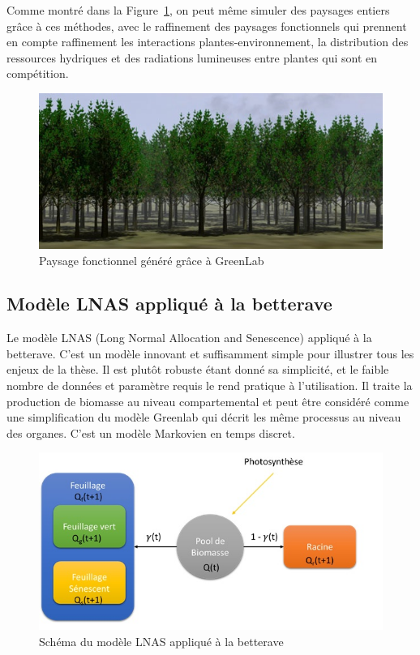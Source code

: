 {Comme montré dans la Figure~\ref{fig:exempleP2},
on peut même simuler des paysages entiers grâce à ces méthodes, 
avec le raffinement des paysages fonctionnels qui prennent en compte
raffinement les interactions plantes-environnement, la distribution des
ressources hydriques et des radiations lumineuses entre plantes 
qui sont en compétition.

\begin{figure}[h]
	\begin{center}
	
	
  \includegraphics[scale=1.3]{./img/exempleP2.jpg}
  \caption{Paysage fonctionnel généré grâce à GreenLab}
  \label{fig:exempleP2}
  
  \end{center}
\end{figure}

 \subsection{Modèle LNAS appliqué à la betterave}
Le modèle LNAS (Long Normal Allocation and Senescence) appliqué à la betterave. C’est un modèle innovant et suffisamment simple pour illustrer tous les enjeux de la thèse. Il est plutôt robuste étant donné sa simplicité, et le faible nombre de données et paramètre requis le rend pratique à l’utilisation. Il traite la production de biomasse au niveau compartemental et peut être considéré comme une simplification du modèle Greenlab qui décrit les même processus au niveau des organes.
 C’est un modèle Markovien en temps discret.
 
 \begin{figure}[h]
 	\begin{center}
 	
 	
   \includegraphics[scale=1.0]{./img/sBeetRoot.jpg}
   \caption{Schéma du modèle LNAS appliqué à la betterave}
   \label{fig:sBeetRoot}
   

\end{center}
\end{figure}}
